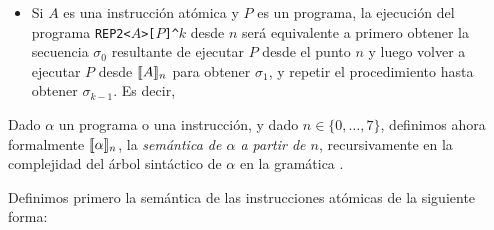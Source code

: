 \begin{itemize}
      
      
      



\item Si $A$ es una instrucción atómica y $P$ es un programa, la ejecución del programa 
\verb#REP2<#$A$\verb#>[#$P$\verb#]^#$k$ desde $n$ será equivalente a primero obtener la secuencia $\sigma_0$ resultante de ejecutar $P$ desde el punto $n$ y luego volver a ejecutar $P$ desde $\llbracket A\rrbracket_n$ para obtener $\sigma_1$, y repetir el procedimiento hasta obtener $\sigma_{k-1}$. Es decir,

\begin{center}
\begin{algorithm}
\end{algorithm}
\end{center}



      
      



\end{itemize}

Dado $\alpha$ un programa o una instrucción, y dado $n\in\{0,\dots,7\}$, definimos ahora formalmente $\llbracket \alpha\rrbracket_n$, la {\em semántica de $\alpha$ a partir de $n$}, recursivamente en la complejidad del árbol sintáctico de $\alpha$ en la gramática \gramgeo.

Definimos primero la semántica de las instrucciones atómicas de la siguiente forma:

